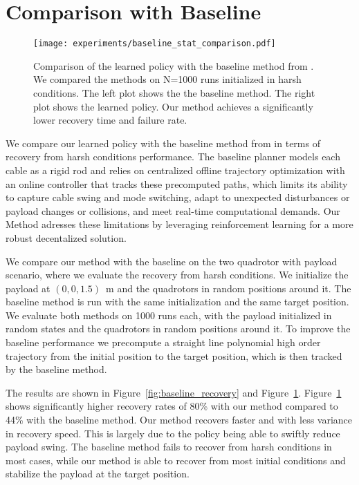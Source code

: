 \section{Comparison with Baseline}
\begin{figure}[H]
    \centering
    
    \texttt{[image: experiments/baseline\_stat\_comparison.pdf]}
    \caption[Baseline vs RL Performance]{Comparison of the learned policy with the baseline method from \autocite{Wahba2024}. We compared the methods on N=1000 runs initialized in harsh conditions. The left plot shows the the baseline method. The right plot shows the learned policy. Our method achieves a significantly lower recovery time and failure rate.}
    \label{fig:baseline_histogram_comparison}

\end{figure}
We compare our learned policy with the baseline method from \autocite{Wahba2024} in terms of recovery from harsh conditions performance. The baseline planner models each cable as a rigid rod and relies on centralized offline trajectory optimization with an online controller that tracks these precomputed paths, which limits its ability to capture cable swing and mode switching, adapt to unexpected disturbances or payload changes or collisions, and meet real-time computational demands. Our Method adresses these limitations by leveraging reinforcement learning for a more robust decentalized solution.

We compare our method with the baseline on the two quadrotor with payload scenario, where we evaluate the recovery from harsh conditions. We initialize the payload at $(0,0,1.5)$~m and the quadrotors in random positions around it. The baseline method is run with the same initialization and the same target position. We evaluate both methods on 1000 runs each, with the payload initialized in random states and the quadrotors in random positions around it. To improve the baseline performance we precompute a straight line polynomial high order trajectory from the initial position to the target position, which is then tracked by the baseline method.

The results are shown in Figure~\ref{fig:baseline_recovery} and Figure~\ref{fig:baseline_histogram_comparison}.
Figure~\ref{fig:baseline_histogram_comparison} shows significantly higher recovery rates of 80\% with our method compared to 44\% with the baseline method. Our method recovers faster and with less variance in recovery speed. This is largely due to the policy being able to swiftly reduce payload swing. The baseline method fails to recover from harsh conditions in most cases, while our method is able to recover from most initial conditions and stabilize the payload at the target position.

